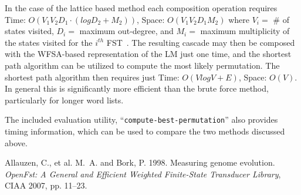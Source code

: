 \documentclass[12pt]{article}
\begin{document}
\clearpage 
\noindent In the case of the lattice based method each composition operation requires Time: $O(V_{1} V_{2} D_{1}\cdot (log D_{2} + M_{2}))$, Space: $O(V_{1} V_{2} D_{1} M_{2})$ where $V_{i} =$ \# of states visited, $D_{i} =$ maximum out-degree, and $M_{i} =$ maximum multiplicity of the states visited for the $i^{th}$ FST~\cite{openfst}.  The resulting cascade may then be composed with the WFSA-based representation of the LM just one time, and the shortest path algorithm can be utilized to compute the most likely permutation.  The shortest path algorithm then requires just Time: $O(V log V + E)$, Space: $O(V)$.  In general this is significantly more efficient than the brute force method, particularly for longer word lists.

The included evaluation utility, ``\texttt{compute-best-permutation}'' also provides timing information, which can be used to compare the two methods discussed above.


\footnotesize
 \begin{thebibliography}{99}

 Allauzen, C., et al. M.~A. and Bork, P. 1998. Measuring genome evolution. {\em Open{F}st: A General and Efficient Weighted Finite-State Transducer Library}, CIAA 2007, pp. 11--23.

\end{thebibliography}
\end{document}
